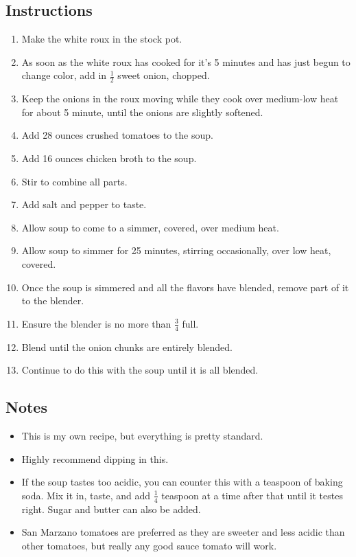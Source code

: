 \begin{multicols}{2}
\subsection*{Instructions}
\begin{enumerate}
    \item Make the white roux in the stock pot.
    \item As soon as the white roux has cooked for it's 5 minutes and has just begun to change color, add in \( \frac{1}{2} \) sweet onion, chopped.
    \item Keep the onions in the roux moving while they cook over medium-low heat for about 5 minute, until the onions are slightly softened.
    \item Add 28 ounces crushed tomatoes to the soup.
    \item Add 16 ounces chicken broth to the soup.
    \item Stir to combine all parts.
    \item Add salt and pepper to taste.
    \item Allow soup to come to a simmer, covered, over medium heat.
    \item Allow soup to simmer for 25 minutes, stirring occasionally, over low heat, covered.
    \item Once the soup is simmered and all the flavors have blended, remove part of it to the blender.
    \item Ensure the blender is no more than \( \frac{3}{4} \) full.
    \item Blend until the onion chunks are entirely blended.
    \item Continue to do this with the soup until it is all blended.
\end{enumerate}

\subsection*{Notes}
\begin{itemize}
    \item This is my own recipe, but everything is pretty standard.
    \item Highly recommend dipping  in this.
    \item If the soup tastes too acidic, you can counter this with a teaspoon of baking soda. Mix it in, taste, and add \( \frac{1}{4} \) teaspoon at a time after that until it testes right. Sugar and butter can also be added.
    \item San Marzano tomatoes are preferred as they are sweeter and less acidic than other tomatoes, but really any good sauce tomato will work.
\end{itemize}
\end{multicols}
\clearpage